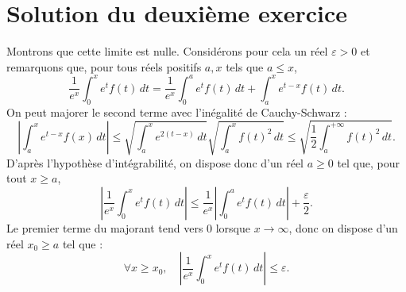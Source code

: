 \section{Solution du deuxième exercice}

Montrons que cette limite est nulle.
Considérons pour cela un réel $\varepsilon > 0$ et remarquons que,  pour tous réels positifs $a,x$ tels que $a \leqslant x$,
\[
\frac1{e^x}\int_0^x e^t f(t)\,dt = \frac1{e^x} \int_0^a e^{t}f(t)\,dt + \int_a^x e^{t-x}f(t)\,dt.
\]
On peut majorer le second terme avec l'inégalité de Cauchy-Schwarz :
\[
\left|\int_a^x e^{t-x}f(x)\,dt\right| \leqslant {\sqrt{\int_a^x e^{2(t-x)}\,dt}}\sqrt{\int_a^x f(t)^2\,dt} \leqslant \sqrt{\frac12 \int_a^{+\infty} f(t)^2\,dt}.
\]
D'après l'hypothèse d'intégrabilité, on dispose donc d'un réel $a \geqslant 0$ tel que, pour tout $x \geqslant a$,
\[
\left|\frac1{e^x}\int_0^x e^t f(t)\,dt \right| \leqslant \frac{1}{e^x}\left|\int_0^a e^t f(t)\,dt\right| + \frac{\varepsilon}2.
\]
Le premier terme du majorant tend vers $0$ lorsque $x \to \infty$, donc on dispose d'un réel $x_0 \geqslant a$ tel que :
\[
\forall x \geqslant x_0,\quad 
\left|\frac1{e^x}\int_0^x e^t f(t)\,dt \right| \leqslant \varepsilon.
\]